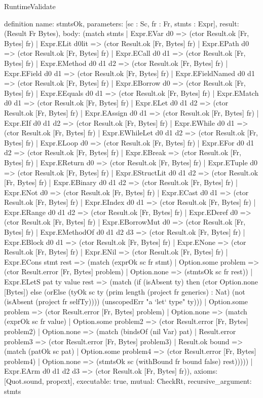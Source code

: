 \begin{lexlean}{RuntimeValidate}
\begin{semanticmodule}
definition{
  name: stmtsOk,
  parameters: [sc : Sc, fr : Fr, stmts : Expr],
  result: (Result Fr Bytes),
  body: (match stmts
    | Expr.EVar d0 => (ctor Result.ok [Fr, Bytes] fr)
    | Expr.ELit d0lit => (ctor Result.ok [Fr, Bytes] fr)
    | Expr.EPath d0 => (ctor Result.ok [Fr, Bytes] fr)
    | Expr.ECall d0 d1 => (ctor Result.ok [Fr, Bytes] fr)
    | Expr.EMethod d0 d1 d2 => (ctor Result.ok [Fr, Bytes] fr)
    | Expr.EField d0 d1 => (ctor Result.ok [Fr, Bytes] fr)
    | Expr.EFieldNamed d0 d1 => (ctor Result.ok [Fr, Bytes] fr)
    | Expr.EBorrow d0 => (ctor Result.ok [Fr, Bytes] fr)
    | Expr.EEquals d0 d1 => (ctor Result.ok [Fr, Bytes] fr)
    | Expr.EMatch d0 d1 => (ctor Result.ok [Fr, Bytes] fr)
    | Expr.ELet d0 d1 d2 => (ctor Result.ok [Fr, Bytes] fr)
    | Expr.EAssign d0 d1 => (ctor Result.ok [Fr, Bytes] fr)
    | Expr.EIf d0 d1 d2 => (ctor Result.ok [Fr, Bytes] fr)
    | Expr.EWhile d0 d1 => (ctor Result.ok [Fr, Bytes] fr)
    | Expr.EWhileLet d0 d1 d2 => (ctor Result.ok [Fr, Bytes] fr)
    | Expr.ELoop d0 => (ctor Result.ok [Fr, Bytes] fr)
    | Expr.EFor d0 d1 d2 => (ctor Result.ok [Fr, Bytes] fr)
    | Expr.EBreak => (ctor Result.ok [Fr, Bytes] fr)
    | Expr.EReturn d0 => (ctor Result.ok [Fr, Bytes] fr)
    | Expr.ETuple d0 => (ctor Result.ok [Fr, Bytes] fr)
    | Expr.EStructLit d0 d1 d2 => (ctor Result.ok [Fr, Bytes] fr)
    | Expr.EBinary d0 d1 d2 => (ctor Result.ok [Fr, Bytes] fr)
    | Expr.ENot d0 => (ctor Result.ok [Fr, Bytes] fr)
    | Expr.ECast d0 d1 => (ctor Result.ok [Fr, Bytes] fr)
    | Expr.EIndex d0 d1 => (ctor Result.ok [Fr, Bytes] fr)
    | Expr.ERange d0 d1 d2 => (ctor Result.ok [Fr, Bytes] fr)
    | Expr.EDeref d0 => (ctor Result.ok [Fr, Bytes] fr)
    | Expr.EBorrowMut d0 => (ctor Result.ok [Fr, Bytes] fr)
    | Expr.EMethodOf d0 d1 d2 d3 => (ctor Result.ok [Fr, Bytes] fr)
    | Expr.EBlock d0 d1 => (ctor Result.ok [Fr, Bytes] fr)
    | Expr.ENone => (ctor Result.ok [Fr, Bytes] fr)
    | Expr.ENil => (ctor Result.ok [Fr, Bytes] fr)
    | Expr.ECons stmt rest => (match (exprOk sc fr stmt)
      | Option.some problem => (ctor Result.error [Fr, Bytes] problem)
      | Option.none => (stmtsOk sc fr rest))
    | Expr.ELetS pat ty value rest => (match (if (isAbsent ty) then (ctor Option.none [Bytes]) else (orElse (tyOk sc ty (prim length (project fr generics) : Nat) (not (isAbsent (project fr selfTy)))) (unscopedErr "a `let` type" ty)))
      | Option.some problem => (ctor Result.error [Fr, Bytes] problem)
      | Option.none => (match (exprOk sc fr value)
        | Option.some problem2 => (ctor Result.error [Fr, Bytes] problem2)
        | Option.none => (match (bindsOf (nil Var) pat)
          | Result.error problem3 => (ctor Result.error [Fr, Bytes] problem3)
          | Result.ok bound => (match (patOk sc pat)
            | Option.some problem4 => (ctor Result.error [Fr, Bytes] problem4)
            | Option.none => (stmtsOk sc (withBound fr bound false) rest)))))
    | Expr.EArm d0 d1 d2 d3 => (ctor Result.ok [Fr, Bytes] fr)),
  axioms: [Quot.sound, propext],
  executable: true,
  mutual: CheckRt,
  recursive_argument: stmts
}


\end{semanticmodule}
\end{lexlean}
